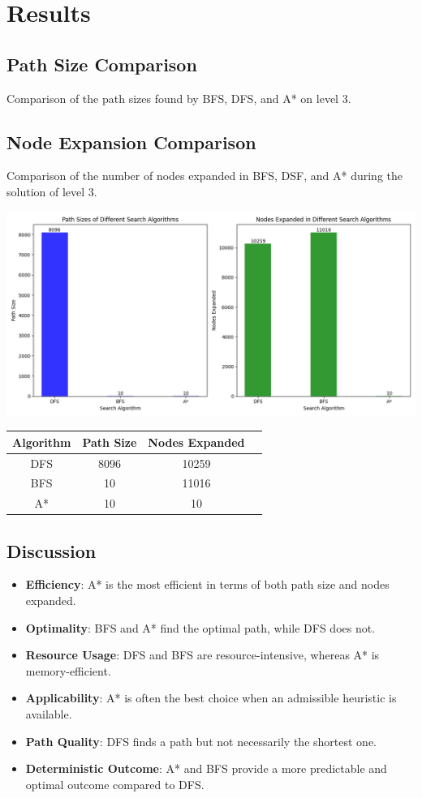 \documentclass{article}
\begin{document}
\section{Results}
\subsection{Path Size Comparison}
Comparison of the path sizes found by BFS, DFS, and A* on level 3.

\subsection{Node Expansion Comparison}
Comparison of the number of nodes expanded in BFS, DSF, and A* during the solution of level 3.

\includegraphics[width=\textwidth]{media/Figure_1.png}


\begin{tabular}{|c|c|c|c|}
    \hline
    Algorithm & Path Size & Nodes Expanded \\
    \hline
    DFS & 8096 & 10259 \\
    BFS & 10 & 11016 \\
    A* & 10 & 10 \\
    \hline
\end{tabular}

\subsection{Discussion}
\begin{itemize}
    \item \textbf{Efficiency}: A* is the most efficient in terms of both path size and nodes expanded.
    \item \textbf{Optimality}: BFS and A* find the optimal path, while DFS does not.
    \item \textbf{Resource Usage}: DFS and BFS are resource-intensive, whereas A* is memory-efficient.
    \item \textbf{Applicability}: A* is often the best choice when an admissible heuristic is available.
    \item \textbf{Path Quality}: DFS finds a path but not necessarily the shortest one.
    \item \textbf{Deterministic Outcome}: A* and BFS provide a more predictable and optimal outcome compared to DFS.
\end{itemize}    
\end{document}
